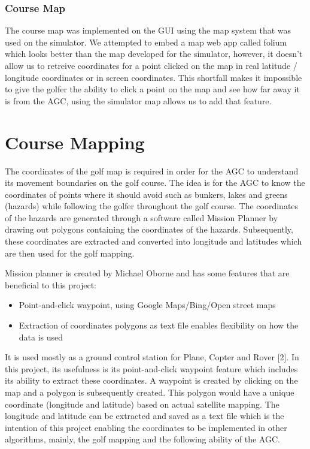\documentclass[11pt,landscape]{article}
\begin{document}
\begin{multicols}{3}
\subsubsection{Course Map}
The course map was implemented on the GUI using the map system that was used on
the simulator. We attempted to embed a map web app called folium which looks
better than the map developed for the simulator, however, it doesn't allow us to
retreive coordinates for a point clicked on the map in real latitude / longitude
coordinates or in screen coordinates. This shortfall makes it impossible to give
the golfer the ability to click a point on the map and see how far away it is
from the AGC, using the simulator map allows us to add that feature.

\section{Course Mapping}
The coordinates of the golf map is required in order for the AGC to understand
its movement boundaries on the golf course. The idea is for the AGC to know the
coordinates of points where it should avoid such as bunkers, lakes and greens
(hazards) while following the golfer throughout the golf course. The coordinates
of the hazards are generated through a software called Mission Planner by
drawing out polygons containing the coordinates of the hazards. Subsequently,
these coordinates are extracted and converted into longitude and latitudes which
are then used for the golf mapping.

Mission planner is created by Michael Oborne and has some features that are
beneficial to this project: 

\begin{itemize}
    \item Point-and-click waypoint, using Google Maps/Bing/Open street maps 
    \item Extraction of coordinates polygons as text file enables flexibility on
    how the data is used 
\end{itemize}

It is used mostly as a ground control station for Plane, Copter and Rover [2].
In this project, its usefulness is its point-and-click waypoint feature which
includes its ability to extract these coordinates. A waypoint is created by
clicking on the map and a polygon is subsequently created. This polygon would
have a unique coordinate (longitude and latitude) based on actual satellite
mapping. The longitude and latitude can be extracted and saved as a text file
which is the intention of this project enabling the coordinates to be
implemented in other algorithms, mainly, the golf mapping and the following
ability of the AGC. 


\end{multicols}
\end{document}

